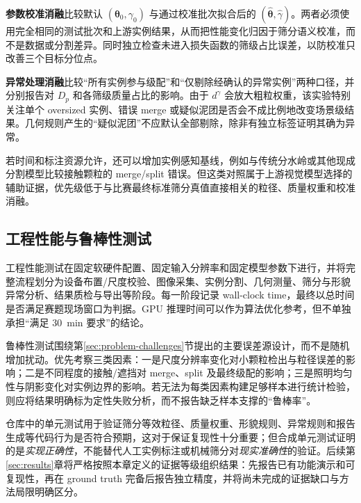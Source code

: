 \textbf{参数校准消融}比较默认 $(\boldsymbol{\theta}_0,\gamma_0)$ 与通过校准批次拟合后的 $(\widehat{\boldsymbol{\theta}},\widehat{\gamma})$。两者必须使用完全相同的测试批次和上游实例结果，从而把性能变化归因于筛分语义校准，而不是数据或分割差异。同时独立检查未进入损失函数的筛级占比误差，以防校准只改善三个目标分位点。

\textbf{异常处理消融}比较“所有实例参与级配”和“仅剔除经确认的异常实例”两种口径，并分别报告对 $D_p$ 和各筛级质量占比的影响。由于 $d^\gamma$ 会放大粗粒权重，该实验特别关注单个 oversized 实例、错误 merge 或疑似泥团是否会不成比例地改变场景级结果。几何规则产生的“疑似泥团”不应默认全部剔除，除非有独立标签证明其确为异常。

若时间和标注资源允许，还可以增加实例感知基线，例如与传统分水岭或其他现成分割模型比较接触颗粒的 merge/split 错误。但这类对照属于上游视觉模型选择的辅助证据，优先级低于与比赛最终标准筛分真值直接相关的粒径、质量权重和校准消融。

\subsection{工程性能与鲁棒性测试}
\label{sec:engineering-evaluation}

工程性能测试在固定软硬件配置、固定输入分辨率和固定模型参数下进行，并将完整流程划分为设备布置/尺度校验、图像采集、实例分割、几何测量、筛分与形貌异常分析、结果质检与导出等阶段。每一阶段记录 wall-clock time，最终以总时间是否满足赛题现场窗口为判据。GPU 推理时间可以作为算法优化参考，但不单独承担“满足 30~min 要求”的结论。

鲁棒性测试围绕第\ref{sec:problem-challenges}节提出的主要误差源设计，而不是随机增加扰动。优先考察三类因素：一是尺度分辨率变化对小颗粒检出与粒径误差的影响；二是不同程度的接触/遮挡对 merge、split 及最终级配的影响；三是照明均匀性与阴影变化对实例边界的影响。若无法为每类因素构建足够样本进行统计检验，则应将结果明确标为定性失败分析，而不报告缺乏样本支撑的“鲁棒率”。

仓库中的单元测试用于验证筛分等效粒径、质量权重、形貌规则、异常规则和报告生成等代码行为是否符合预期，这对于保证复现性十分重要；但合成单元测试证明的是\emph{实现正确性}，不能替代人工实例标注或机械筛分对\emph{现实准确性}的验证。后续第\ref{sec:results}章将严格按照本章定义的证据等级组织结果：先报告已有功能演示和可复现性，再在 ground truth 完备后报告独立精度，并将尚未完成的证据缺口与方法局限明确区分。